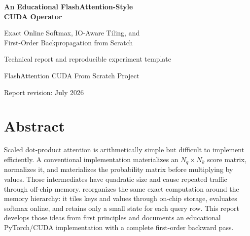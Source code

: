 \begin{titlepage}
  \centering
  \vspace*{18mm}
  {\Huge\bfseries An Educational FlashAttention-Style\\[2mm] CUDA Operator\par}
  \vspace{7mm}
  {\Large Exact Online Softmax, IO-Aware Tiling, and\\First-Order Backpropagation from Scratch\par}
  \vspace{16mm}
  \vfill
  {\large Technical report and reproducible experiment template\par}
  \vspace{3mm}
  {\large FlashAttention CUDA From Scratch Project\par}
  \vspace{5mm}
  {\normalsize Report revision: July 2026\par}
\end{titlepage}

\chapter*{Abstract}

Scaled dot-product attention is arithmetically simple but difficult to implement efficiently. A conventional implementation materializes an $N_q\times N_k$ score matrix, normalizes it, and materializes the probability matrix before multiplying by values. Those intermediates have quadratic size and cause repeated traffic through off-chip memory. 
\FA{} reorganizes the same exact computation around the memory hierarchy: it tiles keys and values through on-chip storage, evaluates softmax online, and retains only a small state for each query row. This report develops those ideas from first principles and documents an educational PyTorch/CUDA implementation with a complete first-order backward pass.

